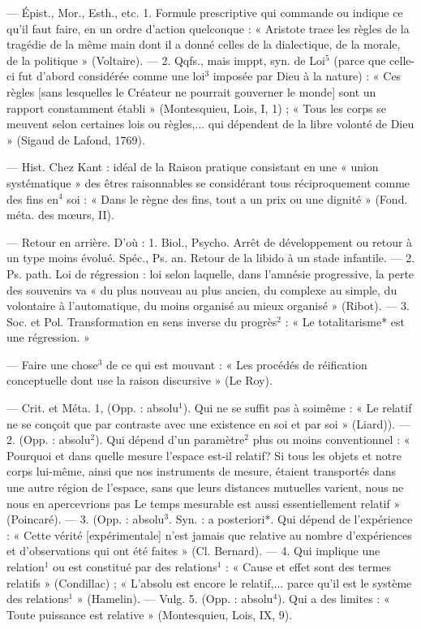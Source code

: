 \begin{itemize}[leftmargin=1cm, label=, itemsep=1pt]
 — Épist., Mor., Esth., etc. 1.
Formule prescriptive qui commande
ou indique ce qu'il faut faire, en un
ordre d'action quelconque : « Aristote trace les règles de la tragédie
de la même main dont il a donné
celles de la dialectique, de la morale,
de la politique » (Voltaire). —
2. Qqfs., mais imppt, syn. de Loi$^5$
(parce que celle-ci fut d’abord considérée comme une loi$^3$ imposée par
Dieu à la nature) : « Ces règles [sans
lesquelles le Créateur ne pourrait
gouverner le monde] sont un rapport constamment établi » (Montesquieu, Lois, I, 1) ; « Tous les corps
se meuvent selon certaines lois ou
règles,... qui dépendent de la
libre volonté de Dieu » (Sigaud de
Lafond, 1769).

 — Hist. Chez Kant :
idéal de la Raison pratique consistant en une « union systématique »
des êtres raisonnables se considérant tous réciproquement comme
des fins en$^4$ soi : « Dans le règne des
fins, tout a un prix ou une dignité »
(Fond. méta. des mœurs, II).

 — Retour en arrière.
D'où : 1. Biol., Psycho. Arrêt de
développement ou retour à un type
moins évolué. Spéc., Ps. an. Retour
de la libido à un stade infantile. —
2. Ps. path. Loi de régression : loi
selon laquelle, dans l’amnésie progressive, la perte des souvenirs va
« du plus nouveau au plus ancien,
du complexe au simple, du volontaire à l’automatique, du moins
organisé au mieux organisé » (Ribot).
— 3. Soc. et Pol. Transformation
en sens inverse du progrès$^2$ :
« Le totalitarisme* est une régression. »

 — Faire une chose$^3$ de ce qui
est mouvant : « Les procédés de
réification conceptuelle dont use
la raison discursive » (Le Roy).

 — Crit. et Méta. 1, (Opp. :
absolu$^1$). Qui ne se suffit pas à soimême : « Le relatif ne se conçoit que
par contraste avec une existence en
soi et par soi » (Liard)). — 2. (Opp. :
absolu$^2$). Qui dépend d'un paramètre$^2$ plus ou moins conventionnel :
« Pourquoi et dans quelle mesure
l’espace est-il relatif? Si tous les
objets et notre corps lui-même, ainsi
que nos instruments de mesure,
étaient transportés dans une autre
région de l'espace, sans que leurs
distances mutuelles varient, nous
ne nous en apercevrions pas Le
temps mesurable est aussi essentiellement relatif » (Poincaré). — 3.
(Opp. : absolu$^3$. Syn. : a posteriori*.
Qui dépend de l'expérience : « Cette
vérité [expérimentale] n’est jamais
que relative au nombre d’expériences et d'observations qui ont été
faites » (Cl. Bernard). — 4. Qui implique une relation$^1$ ou est constitué
par des relations$^1$ : « Cause et effet
sont des termes relatifs » (Condillac) ;
« L’absolu est encore le relatif,...
parce qu'il est le système des relations$^1$ » (Hamelin). — Vulg. 5. (Opp. :
absolu$^4$). Qui a des limites : « Toute
puissance est relative » (Montesquieu, Lois, IX, 9).


\end{itemize}
